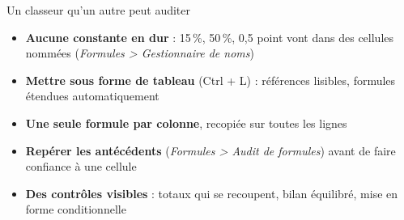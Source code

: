 \documentclass[10pt,aspectratio=169]{beamer}
\begin{document}
\begin{frame}{Un classeur qu'un autre peut auditer}
\begin{center}
\end{center}
\begin{itemize}
  \item \textbf{Aucune constante en dur} : 15\,\%, 50\,\%, 0,5 point vont dans des cellules nommées (\emph{Formules > Gestionnaire de noms})
  \item \textbf{Mettre sous forme de tableau} (Ctrl + L) : références lisibles, formules étendues automatiquement
  \item \textbf{Une seule formule par colonne}, recopiée sur toutes les lignes
  \item \textbf{Repérer les antécédents} (\emph{Formules > Audit de formules}) avant de faire confiance à une cellule
  \item \textbf{Des contrôles visibles} : totaux qui se recoupent, bilan équilibré, mise en forme conditionnelle
\end{itemize}
\end{frame}
\end{document}
